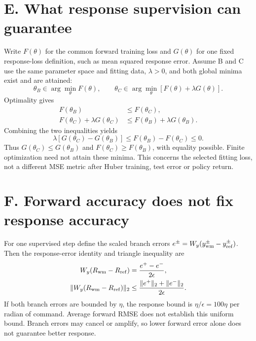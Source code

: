 \documentclass[letterpaper,10pt,conference]{ieeeconf}
\begin{document}
\section*{E. What response supervision can guarantee}
Write $F(\theta)$ for the common forward training loss and $G(\theta)$ for one fixed response-loss definition, such as mean squared response error. Assume B and C use the same parameter space and fitting data, $\lambda>0$, and both global minima exist and are attained:
\begin{equation}
 \theta_B\in\arg\min_\theta F(\theta),\qquad
 \theta_C\in\arg\min_\theta[F(\theta)+\lambda G(\theta)].
\end{equation}
Optimality gives
\begin{equation}
\begin{aligned}
 F(\theta_B)&\le F(\theta_C),\\
 F(\theta_C)+\lambda G(\theta_C)
 &\le F(\theta_B)+\lambda G(\theta_B).
\end{aligned}
\end{equation}
Combining the two inequalities yields
\begin{equation}
 \lambda[G(\theta_C)-G(\theta_B)]
 \le F(\theta_B)-F(\theta_C)\le0.
\end{equation}
Thus $G(\theta_C)\le G(\theta_B)$ and $F(\theta_C)\ge F(\theta_B)$, with equality possible. Finite optimization need not attain these minima. This concerns the selected fitting loss, not a different MSE metric after Huber training, test error or policy return.

\section*{F. Forward accuracy does not fix response accuracy}
For one supervised step define the scaled branch errors
$e^\pm=W_y(y_{\rm wm}^\pm-y_{\rm ref}^\pm)$. Then the response-error identity and triangle inequality are
\begin{equation}
\begin{aligned}
 W_y(R_{\rm wm}-R_{\rm ref})&=\frac{e^+-e^-}{2\epsilon},\\
 \|W_y(R_{\rm wm}-R_{\rm ref})\|_2
 &\le\frac{\|e^+\|_2+\|e^-\|_2}{2\epsilon}.
\end{aligned}
\end{equation}
If both branch errors are bounded by $\eta$, the response bound is $\eta/\epsilon=100\eta$ per radian of command. Average forward RMSE does not establish this uniform bound. Branch errors may cancel or amplify, so lower forward error alone does not guarantee better response.
\end{document}

